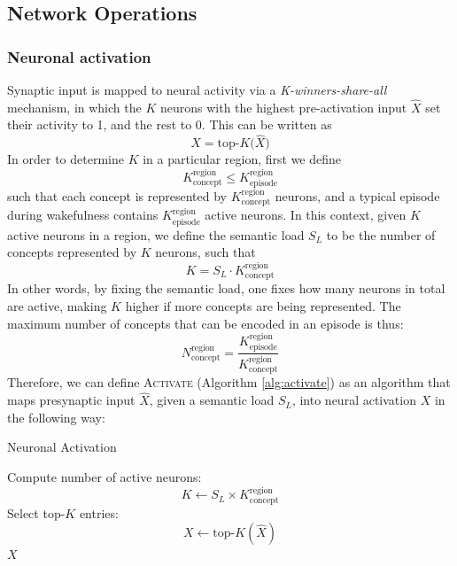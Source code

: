 \documentclass{article}
\begin{document}
\subsection*{Network Operations}
\subsubsection*{Neuronal activation}
Synaptic input is mapped to neural activity via a \textit{K-winners-share-all} mechanism, in which the $K$ neurons with the highest pre-activation input $\hat{X}$ set their activity to 1, and the rest to 0. This can be written as
\begin{equation}
    X = \textrm{top-}K\big(\hat{X}\big)
\end{equation}
In  order to determine $K$ in a particular region, first we define
\begin{equation}
    K^\textrm{region}_\textrm{concept} \leq K^\textrm{region}_\textrm{episode}
\end{equation}
 such that each concept is represented by $K^\textrm{region}_\textrm{concept}$ neurons, and a typical episode during wakefulness contains $K^\textrm{region}_\textrm{episode}$ active neurons. In this context, given $K$ active neurons in a region, we define the semantic load $S_L$ to be the number of concepts represented by $K$ neurons, such that
 \begin{equation}
     K = S_L \cdot K^\textrm{region}_\textrm{concept}
     \label{eq:semantic_load}
 \end{equation}
In other words, by fixing the semantic load, one fixes how many neurons in total are active, making $K$ higher if more concepts are being represented. The maximum number of concepts that can be encoded in an episode is thus:
 \begin{equation}
     N^\textrm{region}_\textrm{concept} = \frac{K^\textrm{region}_\textrm{episode}}{K^\textrm{region}_\textrm{concept}}
 \end{equation}
 Therefore, we can define \textsc{Activate} (Algorithm \ref{alg:activate}) as an algorithm that maps presynaptic input $\hat{X}$, given a semantic load $S_L$, into neural activation $X$ in the following way:
\begin{algorithm}[h!]
\caption{Neuronal Activation}\label{alg:activate}
\begin{algorithmic}[1]
    \State Compute number of active neurons:
        \[
            K \gets S_L \times K^\textrm{region}_\textrm{concept}
        \]
    \State Select top-$K$ entries:
        \[
            X \gets \textrm{top-}K(\hat{X})
        \]
    \State \Return $X$
\EndFunction
\end{algorithmic}
\end{algorithm}
\end{document}
